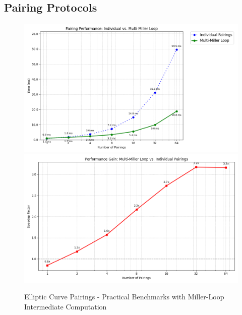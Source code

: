 \subsection{Pairing Protocols}

\begin{figure}
    \centering
    \includegraphics[width=0.75\linewidth]{pairing_comparison.png}
        \includegraphics[width=0.75\linewidth]{pairing_comparison2.png}
    \caption{Elliptic Curve Pairings - Practical Benchmarks with Miller-Loop Intermediate Computation}
    \label{fig:enter-label}
\end{figure}
